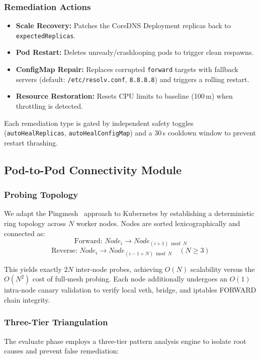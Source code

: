 \documentclass[conference]{IEEEtran}
\begin{document}
\subsubsection{Remediation Actions}
\begin{itemize}
  \item \textbf{Scale Recovery:} Patches the CoreDNS Deployment replicas back to \texttt{expectedReplicas}.
  \item \textbf{Pod Restart:} Deletes unready/crashlooping pods to trigger clean respawns.
  \item \textbf{ConfigMap Repair:} Replaces corrupted \texttt{forward} targets with fallback servers (default: \texttt{/etc/resolv.conf}, \texttt{8.8.8.8}) and triggers a rolling restart.
  \item \textbf{Resource Restoration:} Resets CPU limits to baseline (100\,m) when throttling is detected.
\end{itemize}

Each remediation type is gated by independent safety toggles (\texttt{autoHealReplicas}, \texttt{autoHealConfigMap}) and a 30\,s cooldown window to prevent restart thrashing.

\subsection{Pod-to-Pod Connectivity Module}

\subsubsection{Probing Topology}
We adapt the Pingmesh~\cite{pingmesh2015} approach to Kubernetes by establishing a deterministic ring topology across $N$ worker nodes. Nodes are sorted lexicographically and connected as:
\begin{equation}
  \text{Forward: } Node_i \to Node_{(i+1) \bmod N}
\end{equation}
\begin{equation}
  \text{Reverse: } Node_i \to Node_{(i-1+N) \bmod N} \quad (N \geq 3)
\end{equation}

This yields exactly $2N$ inter-node probes, achieving $O(N)$ scalability versus the $O(N^2)$ cost of full-mesh probing. Each node additionally undergoes an $O(1)$ intra-node canary validation to verify local veth, bridge, and iptables FORWARD chain integrity.

\subsubsection{Three-Tier Triangulation}
The evaluate phase employs a three-tier pattern analysis engine to isolate root causes and prevent false remediation:
\end{document}
